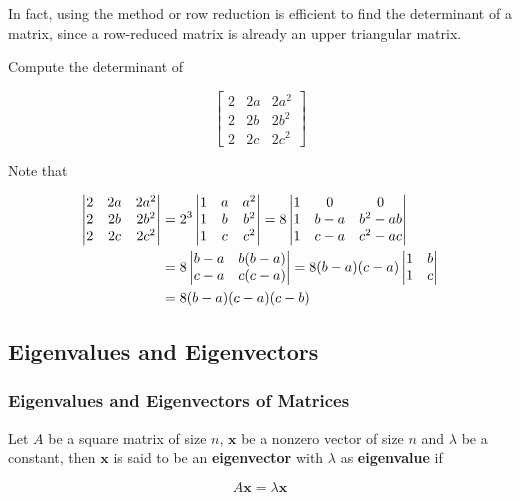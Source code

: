 \documentclass[a4paper,12pt]{article}
\begin{document}
In fact, using the method or row reduction is efficient to find the determinant of a matrix, since a row-reduced matrix is already an upper triangular matrix.\n

\begin{exm}
  Compute the determinant of

  $$\begin{bmatrix}
    2 & 2a & 2a^{2}\\
    2 & 2b & 2b^{2}\\
    2 & 2c & 2c^{2}
  \end{bmatrix}$$\s

  \ans Note that

  $$\begin{aligned}[t]
    \left| \begin{matrix}
      2 & 2a & 2a^{2}\\
      2 & 2b & 2b^{2}\\
      2 & 2c & 2c^{2}
    \end{matrix}\right|&=2^{3}\left| \begin{matrix}
      1 & a & a^{2}\\
      1 & b & b^{2}\\
      1 & c & c^{2}
    \end{matrix}\right|=8\left| \begin{matrix}
      1 & 0 & 0\\
      1 & b-a & b^{2}-ab\\
      1 & c-a & c^{2}-ac
    \end{matrix}\right|\\
    &=8\left| \begin{matrix}
      b-a & b(b-a)\\
      c-a & c(c-a)
    \end{matrix}\right|=8(b-a)(c-a)\left| \begin{matrix}
      1 & b\\
      1 & c
    \end{matrix}\right|\\
    &=8(b-a)(c-a)(c-b)
  \end{aligned}$$
\end{exm}

\subsection{Eigenvalues and Eigenvectors}
\subsubsection{Eigenvalues and Eigenvectors of Matrices}
\begin{dft}
  Let $A$ be a square matrix of size $n$, $\mathbf{x}$ be a nonzero vector of size $n$ and $\lambda$ be a constant, then $\mathbf{x}$ is said to be an \textbf{eigenvector} with $\lambda$ as \textbf{eigenvalue} if

  $$A\mathbf{x}=\lambda\mathbf{x}$$
\end{dft}\n
\end{document}
